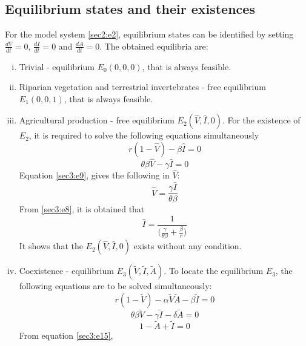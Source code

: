 \documentclass[12pt]{article}
\numberwithin{equation}{section}
\begin{document}
\subsection{Equilibrium states and their existences}
For the model system \eqref{sec2:e2}, equilibrium states can be identified by setting $\frac{dV}{dt}=0$, $\frac{dI}{dt}=0$ and $\frac{dA}{dt}=0$. The obtained equilibria are:
\begin{enumerate}[i)]
\item Trivial - equilibrium $E_0(0,0,0)$, that is always feasible.
\item Riparian vegetation and terrestrial invertebrates - free equilibrium $E_1(0,0,1)$, that is always feasible.
\item Agricultural production - free equilibrium $E_2(\hat V, \hat I, 0)$. For the existence of $E_2$, it is required to solve the following equations simultaneously
\begin{equation}\label{sec3:e8}
r (1- \hat V)- \beta \hat I =0
\end{equation}
\begin{equation}\label{sec3:e9}
\theta \beta  \hat V - \gamma \hat I =0
\end{equation}
Equation \eqref{sec3:e9}, gives the following in $\hat V$:
\begin{equation}\label{sec3:e12}
\hat V = \frac{\gamma \hat I}{\theta \beta}
\end{equation}
From \eqref{sec3:e8}, it is obtained that
\begin{equation}\label{sec3:e10}
\hat I=\frac{1}{\bigg( \frac{\gamma}{\theta \beta} + \frac{\beta}{r}\bigg)}
\end{equation}
It shows that the $E_2(\hat V, \hat I, 0)$ exists without any condition.
\item Coexistence - equilibrium $E_3 (\tilde V, \tilde I, \tilde A)$. To locate the equilibrium $E_3$, the following equations are to be solved simultaneously:
\begin{equation}\label{sec3:e13}
r(1- \tilde V)-\alpha \tilde V \tilde A - \beta \tilde I=0
\end{equation}
\begin{equation}\label{sec3:e14}
\theta \beta \tilde V - \gamma \tilde I - \delta \tilde A=0
\end{equation}
\begin{equation}\label{sec3:e15}
1- \tilde A+\tilde I =0
\end{equation}
From equation \eqref{sec3:e15},
\begin{equation}\label{sec3:e16}

\end{equation}
\end{enumerate}
\end{document}
